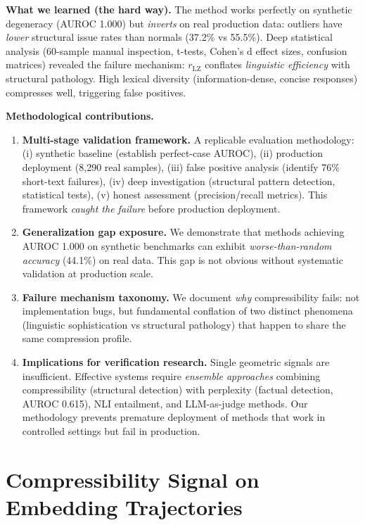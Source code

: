 \documentclass[11pt]{article}
\begin{document}
\textbf{What we learned (the hard way).} The method works perfectly on synthetic degeneracy (AUROC 1.000) but \textit{inverts} on real production data: outliers have \textit{lower} structural issue rates than normals (37.2\% vs 55.5\%). Deep statistical analysis (60-sample manual inspection, t-tests, Cohen's d effect sizes, confusion matrices) revealed the failure mechanism: $r_{\text{LZ}}$ conflates \textit{linguistic efficiency} with structural pathology. High lexical diversity (information-dense, concise responses) compresses well, triggering false positives.

\textbf{Methodological contributions.}
\begin{enumerate}
\item \textbf{Multi-stage validation framework.} A replicable evaluation methodology: (i) synthetic baseline (establish perfect-case AUROC), (ii) production deployment (8,290 real samples), (iii) false positive analysis (identify 76\% short-text failures), (iv) deep investigation (structural pattern detection, statistical tests), (v) honest assessment (precision/recall metrics). This framework \textit{caught the failure} before production deployment.

\item \textbf{Generalization gap exposure.} We demonstrate that methods achieving AUROC 1.000 on synthetic benchmarks can exhibit \textit{worse-than-random accuracy} (44.1\%) on real data. This gap is not obvious without systematic validation at production scale.

\item \textbf{Failure mechanism taxonomy.} We document \textit{why} compressibility fails: not implementation bugs, but fundamental conflation of two distinct phenomena (linguistic sophistication vs structural pathology) that happen to share the same compression profile.

\item \textbf{Implications for verification research.} Single geometric signals are insufficient. Effective systems require \textit{ensemble approaches} combining compressibility (structural detection) with perplexity (factual detection, AUROC 0.615), NLI entailment, and LLM-as-judge methods. Our methodology prevents premature deployment of methods that work in controlled settings but fail in production.
\end{enumerate}

\section{Compressibility Signal on Embedding Trajectories}
\label{sec:signals}
\end{document}
